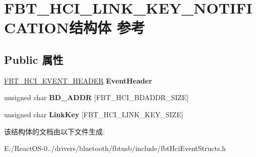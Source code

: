 \hypertarget{struct_f_b_t___h_c_i___l_i_n_k___k_e_y___n_o_t_i_f_i_c_a_t_i_o_n}{}\section{F\+B\+T\+\_\+\+H\+C\+I\+\_\+\+L\+I\+N\+K\+\_\+\+K\+E\+Y\+\_\+\+N\+O\+T\+I\+F\+I\+C\+A\+T\+I\+O\+N结构体 参考}
\label{struct_f_b_t___h_c_i___l_i_n_k___k_e_y___n_o_t_i_f_i_c_a_t_i_o_n}
\subsection*{Public 属性}
\begin{DoxyCompactItemize}
\item 
\mbox{\label{struct_f_b_t___h_c_i___l_i_n_k___k_e_y___n_o_t_i_f_i_c_a_t_i_o_n_a7d0333fb50dcca491b77ac4e63299aaa}} 
\hyperlink{struct_f_b_t___h_c_i___e_v_e_n_t___h_e_a_d_e_r}{F\+B\+T\+\_\+\+H\+C\+I\+\_\+\+E\+V\+E\+N\+T\+\_\+\+H\+E\+A\+D\+ER} {\bfseries Event\+Header}
\item 
\mbox{\label{struct_f_b_t___h_c_i___l_i_n_k___k_e_y___n_o_t_i_f_i_c_a_t_i_o_n_a16c0ff038645d39b98a74a08e95f5505}} 
unsigned char {\bfseries B\+D\+\_\+\+A\+D\+DR} \mbox{[}F\+B\+T\+\_\+\+H\+C\+I\+\_\+\+B\+D\+A\+D\+D\+R\+\_\+\+S\+I\+ZE\mbox{]}
\item 
\mbox{\label{struct_f_b_t___h_c_i___l_i_n_k___k_e_y___n_o_t_i_f_i_c_a_t_i_o_n_a1ed3ecd02c76dfb3540609686a997ff4}} 
unsigned char {\bfseries Link\+Key} \mbox{[}F\+B\+T\+\_\+\+H\+C\+I\+\_\+\+L\+I\+N\+K\+\_\+\+K\+E\+Y\+\_\+\+S\+I\+ZE\mbox{]}
\end{DoxyCompactItemize}


该结构体的文档由以下文件生成\+:\begin{DoxyCompactItemize}
\item 
E\+:/\+React\+O\+S-\/0../drivers/bluetooth/fbtusb/include/fbt\+Hci\+Event\+Structs.\+h\end{DoxyCompactItemize}
